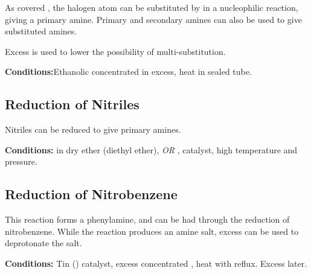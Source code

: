 			As covered \hyperlink{NucleophilicSubstitutionFormingAmines}{}, the halogen atom can be substituted by 
			in a nucleophilic reaction, giving a primary amine. Primary and secondary amines can also be used to give substituted amines.

			Excess  is used to lower the possibility of multi-substitution.

			\vspace{1.5em}
			\vbox{\textbf{Conditions:}\tabto{35mm}Ethanolic concentrated  in excess, heat in sealed tube.}




		\subsection{Reduction of Nitriles}

			Nitriles can be reduced to give primary amines.

			\vspace{1.5em}
			\vbox{\textbf{Conditions:}	\tabto{35mm} in dry ether (diethyl ether), \textit{OR}
										\tabto{35mm},  catalyst, high temperature and pressure.}




		\pagebreak
		\subsection{Reduction of Nitrobenzene}

			This reaction forms a phenylamine, and can be had through the reduction of nitrobenzene. While the reaction produces an amine
			salt, excess  can be used to deprotonate the salt.

			\vspace{1.5em}
			\vbox{\textbf{Conditions:}	\tabto{35mm}Tin () catalyst, excess concentrated ,
										\tabto{35mm}heat with reflux. Excess  later.}

